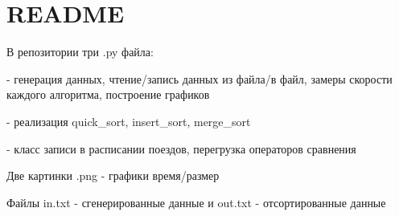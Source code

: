 \chapter{README}
\hypertarget{md__r_e_a_d_m_e}{}\label{md__r_e_a_d_m_e}
В репозитории три .py файла\+:

 -\/ генерация данных, чтение/запись данных из файла/в файл, замеры скорости каждого алгоритма, построение графиков

 -\/ реализация quick\+\_\+sort, insert\+\_\+sort, merge\+\_\+sort

 -\/ класс записи в расписании поездов, перегрузка операторов сравнения

Две картинки .png -\/ графики время/размер

Файлы in.\+txt -\/ сгенерированные данные и out.\+txt -\/ отсортированные данные 